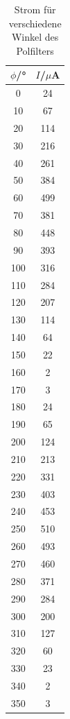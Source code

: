 \begin{table}[H]
	\begin{center}
		\begin{tabular}{c c}
			\toprule
			\(\phi\)/° & \(I\)/\(\mu\)A \\
			\midrule
			0       &24\\
			10      &67\\
			20      &114\\
			30      &216\\
			40      &261\\
			50      &384\\
			60      &499\\
			70      &381\\
			80      &448\\
			90      &393\\
			100     &316\\
			110     &284\\
			120     &207\\
			130     &114\\
			140     &64\\
			150     &22\\
			160     &2\\
			170     &3\\
			180     &24\\
			190     &65\\
			200     &124\\
			210     &213\\
			220     &331\\
			230     &403\\
			240     &453\\
			250     &510\\
			260     &493\\
			270     &460\\
			280     &371\\
			290     &284\\
			300     &200\\
			310     &127\\
			320     &60\\
			330     &23  \\                                                                                            
			340     &2      \\                                                                                         
			350     &3  	\\
			\bottomrule
		\end{tabular}
		\caption{Strom für verschiedene Winkel des Polfilters}
		\label{tab:t4}
	\end{center}
\end{table}

